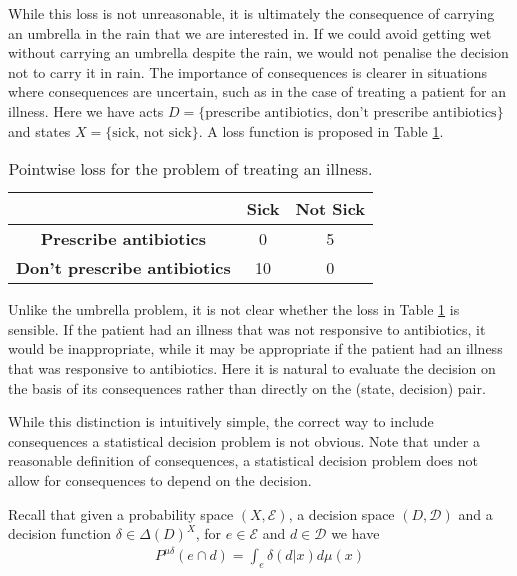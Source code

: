 While this loss is not unreasonable, it is ultimately the consequence of carrying an umbrella in the rain that we are interested in. If we could avoid getting wet without carrying an umbrella despite the rain, we would not penalise the decision not to carry it in rain. The importance of consequences is clearer in situations where consequences are uncertain, such as in the case of treating a patient for an illness. Here we have acts $D=\{\text{prescribe antibiotics, don't prescribe antibiotics}\}$ and states $X=\{\text{sick, not sick}\}$. A loss function is proposed in Table \ref{tab:illness}.

\begin{table}[h]
    \centering
        \begin{tabular}{ | c | c | c | }
        \hline
                              & \textbf{Sick} & \textbf{Not Sick} \\ 
                              \hline
         \textbf{Prescribe antibiotics}       & 0 & 5 \\  
         \textbf{Don't prescribe antibiotics} & 10 & 0   \\ 
         \hline
        \end{tabular}
    \caption{Pointwise loss for the problem of treating an illness.}
    \label{tab:illness}
\end{table}

Unlike the umbrella problem, it is not clear whether the loss in Table \ref{tab:illness} is sensible. If the patient had an illness that was not responsive to antibiotics, it would be inappropriate, while it may be appropriate if the patient had an illness that was responsive to antibiotics. Here it is natural to evaluate the decision on the basis of its consequences rather than directly on the (state, decision) pair.

While this distinction is intuitively simple, the correct way to include consequences a statistical decision problem is not obvious. Note that under a reasonable definition of consequences, a statistical decision problem does not allow for consequences to depend on the decision.

Recall that given a probability space $(X,\mathcal{E})$, a decision space $(D,\mathcal{D})$ and a decision function $\delta\in \Delta(D)^X$, for $e\in\mathcal{E}$ and $d\in\mathcal{D}$ we have
\begin{align}
    P^{\mu\delta}(e\cap d) = \int_e \delta(d|x) d\mu(x)
\end{align}

